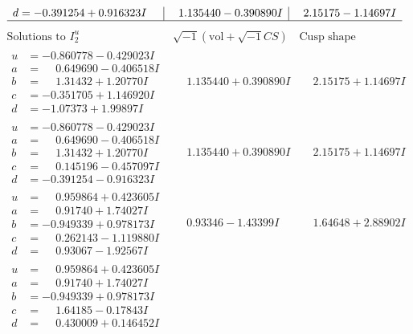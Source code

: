 \documentclass[1p]{elsarticle_modified}
\theoremstyle{definition}
\newcommand{\I}{\sqrt{-1}}
\begin{document}
$$\begin{array}{c|c|c}
\begin{aligned}
d &= -0.391254 + 0.916323 I\end{aligned}
 & \phantom{-}1.135440 - 0.390890 I & \phantom{-}2.15175 - 1.14697 I\\
 \hline 
 \end{array}$$\newpage$$\begin{array}{c|c|c}  
\text{Solutions to }I^u_{2}& \I (\text{vol} + \sqrt{-1}CS) & \text{Cusp shape}\\
 \hline 
\begin{aligned}
u &= -0.860778 - 0.429023 I \\
a &= \phantom{-}0.649690 - 0.406518 I \\
b &= \phantom{-}1.31432 + 1.20770 I \\
c &= -0.351705 + 1.146920 I \\
d &= -1.07373 + 1.99897 I\end{aligned}
 & \phantom{-}1.135440 + 0.390890 I & \phantom{-}2.15175 + 1.14697 I \\ \hline\begin{aligned}
u &= -0.860778 - 0.429023 I \\
a &= \phantom{-}0.649690 - 0.406518 I \\
b &= \phantom{-}1.31432 + 1.20770 I \\
c &= \phantom{-}0.145196 - 0.457097 I \\
d &= -0.391254 - 0.916323 I\end{aligned}
 & \phantom{-}1.135440 + 0.390890 I & \phantom{-}2.15175 + 1.14697 I \\ \hline\begin{aligned}
u &= \phantom{-}0.959864 + 0.423605 I \\
a &= \phantom{-}0.91740 + 1.74027 I \\
b &= -0.949339 + 0.978173 I \\
c &= \phantom{-}0.262143 - 1.119880 I \\
d &= \phantom{-}0.93067 - 1.92567 I\end{aligned}
 & \phantom{-}0.93346 - 1.43399 I & \phantom{-}1.64648 + 2.88902 I \\ \hline\begin{aligned}
u &= \phantom{-}0.959864 + 0.423605 I \\
a &= \phantom{-}0.91740 + 1.74027 I \\
b &= -0.949339 + 0.978173 I \\
c &= \phantom{-}1.64185 - 0.17843 I \\
d &= \phantom{-}0.430009 + 0.146452 I\end{aligned}

\end{array}$$
\end{document}
